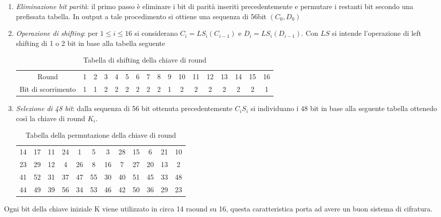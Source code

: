 \documentclass[11pt, a4paper, oneside]{Thesis} %
\begin{document}
\begin{enumerate}
 \item \textit{Eliminazione bit parità}: il primo passo è eliminare i bit di parità inseriti precedentemente e permutare i restanti bit secondo una prefissata tabella. In output a tale procedimento si ottiene una sequenza di 
 56bit $(C_0,D_0)$
 \item \textit{Operazione di shifting}: per $1\le i \le 16$ si considerano $C_i=LS_i(C_{i-1})$ e $D_i=LS_i(D_{i-1})$. Con $LS$ si intende l'operazione di left shifting di 1 o 2 bit in base alla tabella seguente
 \begin{table}[ht] 
      \caption{Tabella di shifting della chiave di round} %
      \centering %
      \begin{tabular}{c c c c c c c c c c c c c c c c c} %
      \hline %
      Round & 1 & 2 & 3 & 4 & 5 & 6 & 7 & 8 & 9 & 10 & 11 & 12 & 13 & 14 & 15 & 16\\
      Bit di scorrimento & 1 & 1 & 2 & 2 & 2 & 2 & 2 & 2 & 1 & 2 & 2 & 2 & 2 & 2 & 2 & 1\\           
      \hline %
      \end{tabular} 
      \label{table:tabShiftingKey} %
      \end{table}

 \item \textit{Selezione di 48 bit}: dalla sequenza di 56 bit ottenuta precedentemente $C_iS_i$ si individuano i 48 bit in base alla seguente tabella ottenedo così la chiave di round $K_i$.
 \begin{table}[ht] 
      \caption{Tabella della permutazione della chiave di round} %
      \centering %
      \begin{tabular}{c c c c c c c c c c c c} %
      \hline %
      14 & 17 & 11 & 24 &  1 &  5 &  3 & 28 & 15 &  6 & 21 & 10 \\
      23 & 29 & 12 &  4 & 26 &  8 & 16 &  7 & 27 & 20 & 13 &  2 \\       
      41 & 52 & 31 & 37 & 47 & 55 & 30 & 40 & 51 & 45 & 33 & 48 \\
      44 & 49 & 39 & 56 & 34 & 53 & 46 & 42 & 50 & 36 & 29 & 23 \\       
      \hline %
      \end{tabular} 
      \label{table:tabPermutationKey} %
      \end{table}
 
\end{enumerate}
Ogni bit della chiave iniziale K viene utilizzato in circa 14 raound su 16, questa caratteristica porta ad avere un buon sistema di cifratura.
\end{document}
